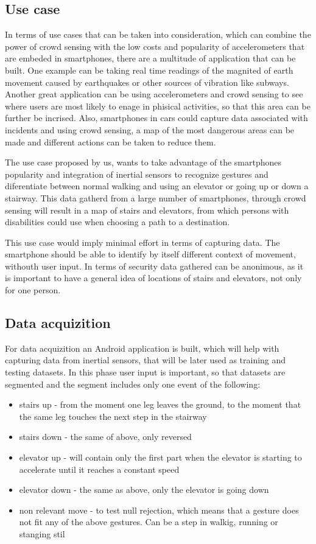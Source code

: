 \subsection{Use case}

In terms of use cases that can be taken into consideration, which can combine the power of crowd sensing with the low costs and popularity of accelerometers that are embeded in smartphones, there are a multitude of application that can be built. One example can be taking real time readings of the magnited of earth movement caused by earthquakes or other sources of vibration like subways. Another great application can be using accelerometers and crowd sensing to see where users are most likely to enage in phisical activities, so that this area can be further be incrised. Also, smartphones in cars could capture data associated with incidents and using crowd sensing, a map of the most dangerous areas can be made and different actions can be taken to reduce them.

The use case proposed by us, wants to take advantage of the smartphones popularity and integration of inertial sensors to recognize gestures and diferentiate between normal walking and using an elevator or going up or down a stairway. This data gatherd from a large number of smartphones, through crowd sensing will result in a map of stairs and elevators, from which persons with disabilities could use when choosing a path to a destination.

This use case would imply minimal effort in terms of capturing data. The smartphone should be able to identify by itself different context of movement, withouth user input. In terms of security data gathered can be anonimous, as it is important to have a general idea of locations of stairs and elevators, not only for one person.

\subsection{Data acquizition}

For data acquizition an Android application is built, which will help with capturing data from inertial sensors, that will be later used as training and testing datasets. In this phase user input is important, so that datasets are segmented and the segment includes only one event of the following:
 \begin{itemize}
\item stairs up - from the moment one leg leaves the ground, to the moment that the same leg touches the next step in the stairway
\item stairs down - the same of above, only reversed
\item elevator up - will contain only the first part when the elevator is starting to accelerate until it reaches a constant speed
\item elevator down - the same as above, only the elevator is going down
\item non relevant move - to test null rejection, which means that a gesture does not fit any of the above gestures. Can be a step in walkig, running or stanging stil
\end{itemize}

